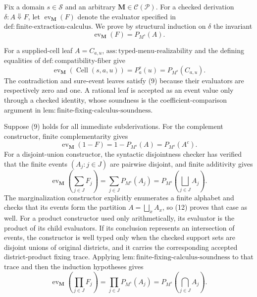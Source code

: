 Fix a domain \(s\in\mathcal S\) and an arbitrary
\(\mathbf M\in\mathcal C(\mathcal P)\).  For a checked derivation
\(\delta:A\Downarrow F\), let
\(\operatorname{ev}_{\mathbf M}(F)\) denote the evaluator specified in
\(\mathrm{def:finite\text{-}extraction\text{-}calculus}\).  We prove by
structural induction on \(\delta\) the invariant
\[
 \operatorname{ev}_{\mathbf M}(F)=P_{M^s}(A).
 \tag{9}
\]

For a supplied-cell leaf \(A=C_{a,u}\),
\(\mathrm{ass:typed\text{-}menu\text{-}realizability}\) and the defining
equalities of \(\mathrm{def:compatibility\text{-}fiber}\) give
\[
 \operatorname{ev}_{\mathbf M}(\operatorname{Cell}(s,a,u))
 =P_a^s(u)=P_{M^s}(C_{a,u}).
 \tag{10}
\]
The contradiction and sure-event leaves satisfy (9) because their evaluators
are respectively zero and one.  A rational leaf is accepted as an event value
only through a checked identity, whose soundness is the coefficient-comparison
argument in
\(\mathrm{lem:finite\text{-}fixing\text{-}calculus\text{-}soundness}\).

Suppose (9) holds for all immediate subderivations.  For the complement
constructor, finite complementarity gives
\[
 \operatorname{ev}_{\mathbf M}(1-F)
 =1-P_{M^s}(A)=P_{M^s}(A^c).
 \tag{11}
\]
For a disjoint-union constructor, the syntactic disjointness checker has
verified that the finite events \((A_j:j\in J)\) are pairwise disjoint, and
finite additivity gives
\[
 \operatorname{ev}_{\mathbf M}\!\left(\sum_{j\in J}F_j\right)
 =\sum_{j\in J}P_{M^s}(A_j)
 =P_{M^s}\!\left(\bigsqcup_{j\in J}A_j\right).
 \tag{12}
\]
The marginalization constructor explicitly enumerates a finite alphabet and
checks that its events form the partition
\(A=\bigsqcup_x A_x\), so (12) proves that case as well.  For a product
constructor used only arithmetically, its evaluator is the product of its child
evaluators.  If its conclusion represents an intersection of events, the
constructor is well typed only when the checked support sets are disjoint
unions of original districts, and it carries the corresponding accepted
district-product fixing trace.  Applying
\(\mathrm{lem:finite\text{-}fixing\text{-}calculus\text{-}soundness}\) to
that trace and then the induction hypotheses gives
\[
 \operatorname{ev}_{\mathbf M}\!\left(\prod_{j\in J}F_j\right)
 =\prod_{j\in J}P_{M^s}(A_j)
 =P_{M^s}\!\left(\bigcap_{j\in J}A_j\right).
 \tag{13}
\]

